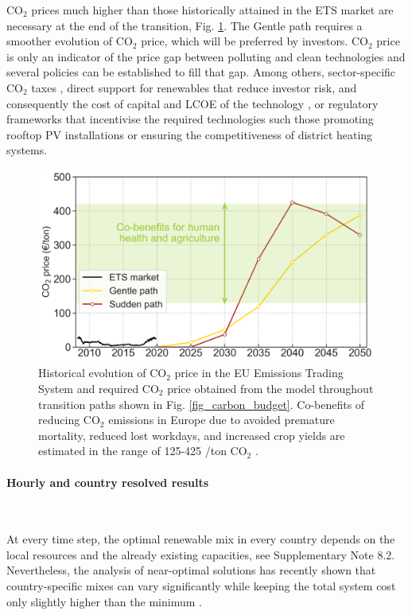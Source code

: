 \documentclass[5p]{elsarticle} %
\begin{document}
CO$_2$ prices much higher than those historically attained in the ETS market are necessary at the end of the transition, Fig. \ref{fig_co2price}. The Gentle path requires a smoother evolution of CO$_2$ price, which will be preferred by investors. CO$_2$ price is only an indicator of the price gap between polluting and clean technologies and several policies can be established to fill that gap. Among others, sector-specific CO$_2$ taxes \cite{Carbon_pricing_2019}, direct support for renewables that reduce investor risk, and consequently the cost of capital and LCOE of the technology \cite{Vartiainen_2019}, or regulatory frameworks that incentivise the required technologies such those promoting rooftop PV installations or ensuring the competitiveness of district heating systems. 

\begin{figure}[!h]
\centering
\includegraphics[width=\columnwidth]{figures/co2_price.png}
\caption{Historical evolution of CO$_2$ price in the EU Emissions Trading System \cite{ETS} and required CO$_2$ price obtained from the model throughout transition paths shown in Fig. \ref{fig_carbon_budget}. 
Co-benefits of reducing CO$_2$ emissions in Europe due to avoided premature mortality, reduced lost workdays, and increased crop yields are estimated in the range of 125-425 \EUR/ton CO$_2$ \cite{Vandyck_2018}.} \label{fig_co2price} 
\end{figure}

\paragraph{\textbf{Hourly and country resolved results}} \

At every time step, the optimal renewable mix in every country depends on the local resources and the already existing capacities, see Supplementary Note 8.2. Nevertheless, the analysis of near-optimal solutions has recently shown that country-specific mixes can vary significantly while keeping the total system cost only slightly higher than the minimum \cite{Neumann_2019}. \\
\end{document}
